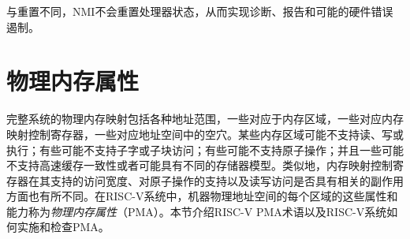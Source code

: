 {与重置不同，NMI不会重置处理器状态，从而实现诊断、报告和可能的硬件错误遏制。

\section{物理内存属性}
\label{sec:pma}

\iffalse
The physical memory map for a complete system includes various address
ranges, some corresponding to memory regions, some to memory-mapped
control registers, and some to vacant holes in the address space.  Some
memory regions might not support reads, writes, or execution; some
might not support subword or subblock accesses; some might not support
atomic operations; and some might not support cache coherence or might
have different memory models.  Similarly, memory-mapped control
registers vary in their supported access widths, support for atomic
operations, and whether read and write accesses have associated side
effects.  In RISC-V systems, these properties and capabilities of each
region of the machine's physical address space are termed {\em
  physical memory attributes} (PMAs).  This section describes RISC-V
PMA terminology and how RISC-V systems implement and check PMAs.
\fi
完整系统的物理内存映射包括各种地址范围，一些对应于内存区域，一些对应内存映射控制寄存器，一些对应地址空间中的空穴。某些内存区域可能不支持读、写或执行；有些可能不支持子字或子块访问；有些可能不支持原子操作；并且一些可能不支持高速缓存一致性或者可能具有不同的存储器模型。类似地，内存映射控制寄存器在其支持的访问宽度、对原子操作的支持以及读写访问是否具有相关的副作用方面也有所不同。在RISC-V系统中，机器物理地址空间的每个区域的这些属性和能力称为{\em 物理内存属性}（PMA）。本节介绍RISC-V PMA术语以及RISC-V系统如何实施和检查PMA。

}

